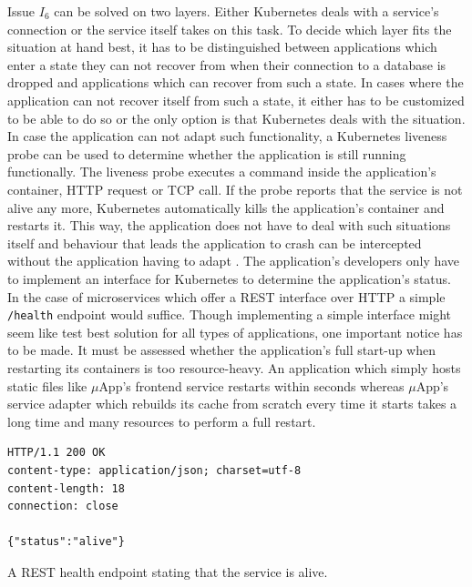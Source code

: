 Issue $I_6$ can be solved on two layers. Either Kubernetes deals with a
service's connection or the service itself takes on this task. To decide which
layer fits the situation at hand best, it has to be distinguished between
applications which enter a state they can not recover from when their
connection to a database is dropped and applications which can recover from
such a state. In cases where the application can not recover itself from such a
state, it either has to be customized to be able to do so or the only option is
that Kubernetes deals with the situation. In case the application can not adapt
such functionality, a Kubernetes liveness probe can be used to determine
whether the application is still running functionally. The liveness probe
executes a command inside the application's container, \ac{HTTP} request or
\ac{TCP} call. If the probe reports that the service is not alive any more,
Kubernetes automatically kills the application's container and restarts it.
This way, the application does not have to deal with such situations itself and
behaviour that leads the application to crash can be intercepted without the
application having to adapt \autocite{AuthorsConfigureLivenessReadiness2019}.
The application's developers only have to implement an interface for Kubernetes
to determine the application's status. In the case of microservices which offer
a \ac{REST} interface over \ac{HTTP} a simple \texttt{/health} endpoint would
suffice. Though implementing a simple interface might seem like test best
solution for all types of applications, one important notice has to be made. It
must be assessed whether the application's full start-up when restarting its
containers is too resource-heavy. An application which simply hosts static
files like $\mu$App's frontend service restarts within seconds whereas
$\mu$App's service adapter which rebuilds its cache from scratch every time it
starts takes a long time and many resources to perform a full restart.

\begin{listing}[H]
  \begin{verbatim}
HTTP/1.1 200 OK
content-type: application/json; charset=utf-8
content-length: 18
connection: close

{"status":"alive"}
  \end{verbatim}
  \caption[A REST health endpoint stating that the service is alive.]{A
  \ac{REST} health endpoint stating that the service is alive.}%
  \label{listing:health_endpoint_http}
\end{listing}

